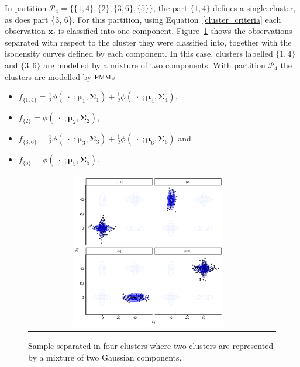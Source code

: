 \documentclass[submit]{smj}
\theoremstyle{definition}
\newcommand{\m}[1]{\boldsymbol{#1}}
\newcommand{\fmm}{\textsc{fmm}\xspace}
\begin{document}
In partition $\mathcal{P}_4 = \{\{1, 4\},\{2\}, \{3, 6\}, \{5\} \}$, the part $\{1, 4\}$ defines a single cluster, as does part \{3, 6\}. For this partition, using Equation~\ref{cluster_criteria} each observation $\m x_i$ is classified into one component. Figure~\ref{ex_two_one} shows the observations separated with respect to the cluster they were classified into, together with the isodensity curves defined by each component. In this case, clusters labelled $\{1,4\}$ and $\{3, 6\}$ are modelled by a mixture of two components. With partition $\mathcal{P}_4$ the clusters are modelled by $\fmm$s
\begin{itemize}
\item $f_{\{1,4\}} = \frac{1}{2} \phi(\;\cdot\; ;  \m\mu_1, \m\Sigma_1) + \frac{1}{2} \phi(\;\cdot\; ;  \m\mu_4, \m\Sigma_4)$, 
\item $f_{\{2\}} = \phi(\;\cdot\; ;  \m\mu_2, \m\Sigma_2)$, 
\item $f_{\{3,6\}} =  \frac{1}{2} \phi(\;\cdot\; ;  \m\mu_3, \m\Sigma_3) + \frac{1}{2} \phi(\;\cdot\; ;  \m\mu_6, \m\Sigma_6)$ and
\item $f_{\{5\}} = \phi(\;\cdot\; ;  \m\mu_5, \m\Sigma_5)$.
\end{itemize}

\begin{figure}[h]
\begin{center}
\begin{tabular}{cc}
  \includegraphics[width=0.65\textwidth]{figures/partition-example-part4.pdf} \\
 \end{tabular}
 \caption{Sample separated in four clusters where two clusters are represented by a mixture of two Gaussian components.}\label{ex_two_one}
\end{center}
\end{figure}
\end{document}
